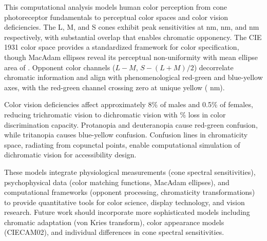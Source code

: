 \documentclass[11pt,a4paper]{article}
\begin{document}
This computational analysis models human color perception from cone photoreceptor fundamentals to perceptual color spaces and color vision deficiencies. The L, M, and S cones exhibit peak sensitivities at  nm,  nm, and  nm respectively, with substantial overlap that enables chromatic opponency. The CIE 1931 color space provides a standardized framework for color specification, though MacAdam ellipses reveal its perceptual non-uniformity with mean ellipse area of . Opponent color channels ($L - M$, $S - (L+M)/2$) decorrelate chromatic information and align with phenomenological red-green and blue-yellow axes, with the red-green channel crossing zero at unique yellow ( nm).

Color vision deficiencies affect approximately 8\% of males and 0.5\% of females, reducing trichromatic vision to dichromatic vision with \% loss in color discrimination capacity. Protanopia and deuteranopia cause red-green confusion, while tritanopia causes blue-yellow confusion. Confusion lines in chromaticity space, radiating from copunctal points, enable computational simulation of dichromatic vision for accessibility design.

These models integrate physiological measurements (cone spectral sensitivities), psychophysical data (color matching functions, MacAdam ellipses), and computational frameworks (opponent processing, chromaticity transformations) to provide quantitative tools for color science, display technology, and vision research. Future work should incorporate more sophisticated models including chromatic adaptation (von Kries transform), color appearance models (CIECAM02), and individual differences in cone spectral sensitivities.
\end{document}
